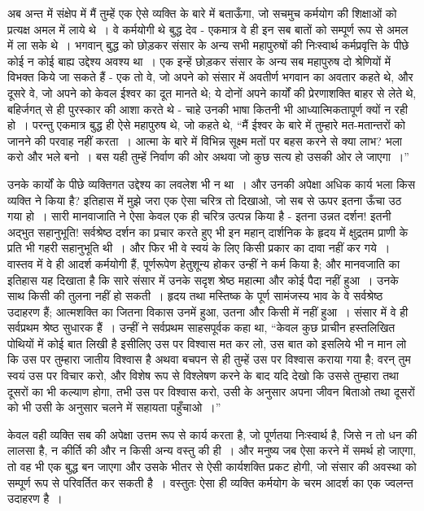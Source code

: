 अब अन्त में संक्षेप में मैं तुम्हें एक ऐसे व्यक्ति के बारे में बताऊँगा, जो सचमुच कर्मयोग की शिक्षाओं को प्रत्यक्ष अमल में लाये थे~। वे कर्मयोगी थे बुद्ध देव - एकमात्र वे ही इन सब बातों को सम्पूर्ण रूप से अमल में ला सके थे~। भगवान् बुद्ध को छोड़कर संसार के अन्य सभी महापुरुषों की निःस्वार्थ कर्मप्रवृत्ति के पीछे कोई न कोई बाह्य उद्देश्य अवश्य था~। एक इन्हें छोड़कर संसार के अन्य सब महापुरुष दो श्रेणियों में विभक्त किये जा सकते हैं - एक तो वे, जो अपने को संसार में अवतीर्ण भगवान का अवतार कहते थे, और दूसरे वे, जो अपने को केवल ईश्वर का दूत मानते थे; ये दोनों अपने कार्यों की प्रेरणाशक्ति बाहर से लेते थे, बहिर्जगत् से ही पुरस्कार की आशा करते थे - चाहे उनकी भाषा कितनी भी आध्यात्मिकतापूर्ण क्यों न रही हो~। परन्तु एकमात्र बुद्ध ही ऐसे महापुरुष थे, जो कहते थे, “मैं ईश्वर के बारे में तुम्हारे मत-मतान्तरों को जानने की परवाह नहीं करता~। आत्मा के बारे में विभिन्न सूक्ष्म मतों पर बहस करने से क्या लाभ? भला करो और भले बनो~। बस यही तुम्हें निर्वाण की ओर अथवा जो कुछ सत्य हो उसकी ओर ले जाएगा~।”

उनके कार्यों के पीछे व्यक्तिगत उद्देश्य का लवलेश भी न था~। और उनकी अपेक्षा अधिक कार्य भला किस व्यक्ति ने किया है? इतिहास में मुझे जरा एक ऐसा चरित्र तो दिखाओ, जो सब से ऊपर इतना ऊँचा उठ गया हो~। सारी मानवाजाति ने ऐसा केवल एक ही चरित्र उत्पन्न किया है - इतना उन्नत दर्शन! इतनी अद्भुत सहानुभूति! सर्वश्रेष्ठ दर्शन का प्रचार करते हुए भी इन महान् दार्शनिक के हृदय में क्षुद्रतम प्राणी के प्रति भी गहरी सहानुभूति थी~। और फिर भी वे स्वयं के लिए किसी प्रकार का दावा नहीं कर गये~। वास्तव में वे ही आदर्श कर्मयोगी हैं, पूर्णरूपेण हेतुशून्य होकर उन्हीं ने कर्म किया है; और मानवजाति का इतिहास यह दिखाता है कि सारे संसार में उनके सदृश श्रेष्ठ महात्मा और कोई पैदा नहीं हुआ~। उनके साथ किसी की तुलना नहीं हो सकती~। हृदय तथा मस्तिष्क के पूर्ण सामंजस्य भाव के वे सर्वश्रेष्ठ उदाहरण हैं; आत्मशक्ति का जितना विकास उनमें हुआ, उतना और किसी में नहीं हुआ~। संसार में वे ही सर्वप्रथम श्रेष्ठ सुधारक हैं~। उन्हीं ने सर्वप्रथम साहसपूर्वक कहा था, “केवल कुछ प्राचीन हस्तलिखित पोथियों में कोई बात लिखी है इसीलिए उस पर विश्वास मत कर लो, उस बात को इसलिये भी न मान लो कि उस पर तुम्हारा जातीय विश्वास है अथवा बचपन से ही तुम्हें उस पर विश्वास कराया गया है; वरन् तुम स्वयं उस पर विचार करो, और विशेष रूप से विश्लेषण करने के बाद यदि देखो कि उससे तुम्हारा तथा दूसरों का भी कल्याण होगा, तभी उस पर विश्वास करो, उसी के अनुसार अपना जीवन बिताओ तथा दूसरों को भी उसी के अनुसार चलने में सहायता पहुँचाओ~।”

केवल वही व्यक्ति सब की अपेक्षा उत्तम रूप से कार्य करता है, जो पूर्णतया निःस्वार्थ है, जिसे न तो धन की लालसा है, न कीर्ति की और न किसी अन्य वस्तु की ही~। और मनुष्य जब ऐसा करने में समर्थ हो जाएगा, तो वह भी एक बुद्ध बन जाएगा और उसके भीतर से ऐसी कार्यशक्ति प्रकट होगी, जो संसार की अवस्था को सम्पूर्ण रूप से परिवर्तित कर सकती है~। वस्तुतः ऐसा ही व्यक्ति कर्मयोग के चरम आदर्श का एक ज्वलन्त उदाहरण है~।

